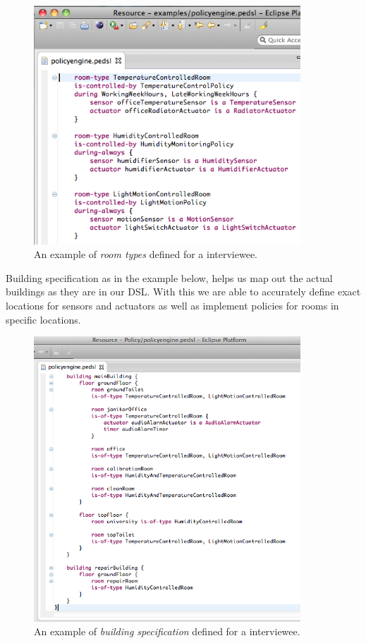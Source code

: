 \documentclass{llncs}
\begin{document}
\begin{figure}
  \centering
    \includegraphics[width=10cm]{dsl-room-types.png}
	\caption{An example of \textit{room types} defined for a interviewee.}
	\label{fig:room-types}
\end{figure}

\newpage
Building specification as in the example below, helps us map out the actual buildings as they are in our DSL. With this we are able to accurately define exact locations for sensors and actuators as well as implement policies for rooms in specific locations. 

\begin{figure}
  \centering
	 \includegraphics[width=10cm]{dsl-building-definition.png}  
	\caption{An example of \textit{building specification} defined for a interviewee.}
	\label{fig:dsl-building-definition}
\end{figure}
\end{document}
